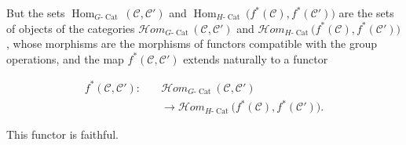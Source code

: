 But the sets
$\operatorname{Hom}_{G\text{-}\operatorname{Cat}}
(\mathcal C,\mathcal C')$ and
$\operatorname{Hom}_{H\text{-}\operatorname{Cat}}
\bigl(f^*(\mathcal C),f^*(\mathcal C')\bigr)$ are the sets of objects
of the categories
$\mathcal H\!om_{G\text{-}\operatorname{Cat}}
(\mathcal C,\mathcal C')$ and
$\mathcal H\!om_{H\text{-}\operatorname{Cat}}
\bigl(f^*(\mathcal C),f^*(\mathcal C')\bigr)$, whose morphisms are the
morphisms of functors compatible with the group operations, and the map
$f^*(\mathcal C,\mathcal C')$ extends naturally to a functor

\begin{equation}
  \begin{aligned}
    f^*(\mathcal C,\mathcal C')\colon\quad
      &\mathcal H\!om_{G\text{-}\operatorname{Cat}}
        (\mathcal C,\mathcal C')\\
      &\longrightarrow
        \mathcal H\!om_{H\text{-}\operatorname{Cat}}
        \bigl(f^*(\mathcal C),f^*(\mathcal C')\bigr).
  \end{aligned}
  \tag{1.4.1.5}
\end{equation}

This functor is faithful.
